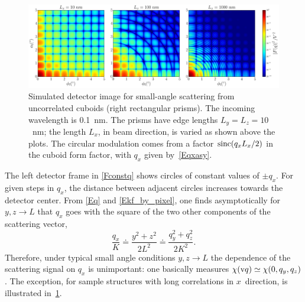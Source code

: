 \begin{figure}[t]
\begin{center}
\includegraphics[width=1\textwidth]{fig/ff2/ff_det_box.pdf}
\end{center}
\caption{Simulated detector image for small-angle scattering from
uncorrelated cuboids (right rectangular prisms).
The incoming wavelength is 0.1~nm.
The prisms have edge lengths $L_y=L_z=10$~nm;
the length $L_x$, in beam direction, is varied as shown above the plots.
The circular modulation comes from a factor $\operatorname{sinc}(q_x L_x/2)$
in the cuboid form factor, with $q_x$ given by~\cref{Eqxasy}.}
\label{Fdetbox}
\end{figure}

The left detector frame in \cref{Fconstq}
shows circles of constant values of $\pm q_x$.
For given steps in $q_x$, the distance between adjacent circles
increases towards the detector center.
From \cref{Eq} and \cref{Ekf_by_pixel},
one finds asymptotically for $y,z\to L$
that $q_x$ goes with the square of the two other components of the scattering vector,
\begin{equation}\label{Eqxasy}
  \frac{q_x}{K}
  \doteq \frac{y^2+z^2}{2 L^2}
  \doteq \frac{q_y^2 + q_z^2}{2K^2}.
\end{equation}
Therefore, under typical small angle conditions $y,z\to L$
the dependence of the scattering signal on $q_x$ is unimportant:
one basically measures $\chi(\text{v}{q})\simeq \chi(0,q_y,q_z)$.
The exception, for sample structures with long correlations in $x$~direction,
is illustrated in~\cref{Fdetbox}.

